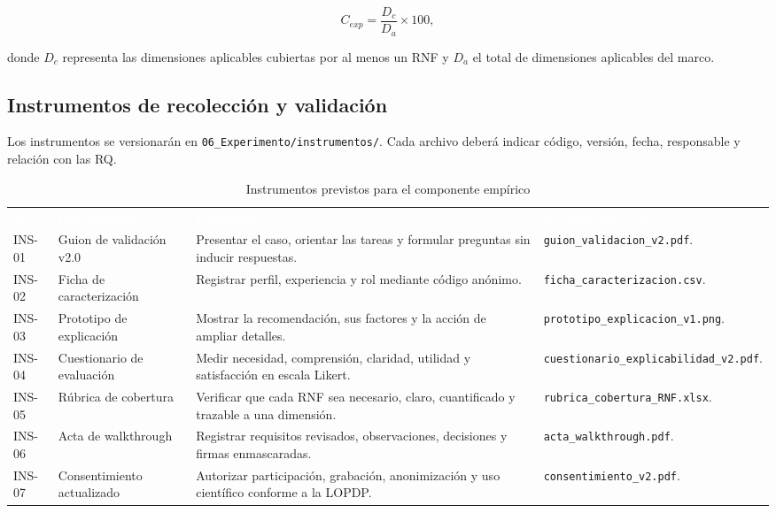 \documentclass[12pt,a4paper]{article}
\begin{document}
\begin{equation}
C_{exp} = \frac{D_c}{D_a} \times 100,
\label{eq:cobertura-explicabilidad}
\end{equation}

donde $D_c$ representa las dimensiones aplicables cubiertas por al menos un RNF y $D_a$ el total de dimensiones aplicables del marco.

\subsection{Instrumentos de recolección y validación}

Los instrumentos se versionarán en \nolinkurl{06_Experimento/instrumentos/}. Cada archivo deberá indicar código, versión, fecha, responsable y relación con las RQ.

\begin{table}[H]
\centering
\caption{Instrumentos previstos para el componente empírico}
\label{tab:instrumentos-experimento}
\small
{}
\begin{tabularx}{\textwidth}{C{1.35cm} L{3.35cm} Y L{3.45cm}}
\textcolor{white}{\textbf{ID}} &
\textcolor{white}{\textbf{Instrumento}} &
\textcolor{white}{\textbf{Finalidad}} &
\textcolor{white}{\textbf{Archivo previsto}}\\
INS-01 & Guion de validación v2.0 & Presentar el caso, orientar las tareas y formular preguntas sin inducir respuestas. & \nolinkurl{guion_validacion_v2.pdf}.\\
INS-02 & Ficha de caracterización & Registrar perfil, experiencia y rol mediante código anónimo. & \nolinkurl{ficha_caracterizacion.csv}.\\
INS-03 & Prototipo de explicación & Mostrar la recomendación, sus factores y la acción de ampliar detalles. & \nolinkurl{prototipo_explicacion_v1.png}.\\
INS-04 & Cuestionario de evaluación & Medir necesidad, comprensión, claridad, utilidad y satisfacción en escala Likert. & \nolinkurl{cuestionario_explicabilidad_v2.pdf}.\\
INS-05 & Rúbrica de cobertura & Verificar que cada RNF sea necesario, claro, cuantificado y trazable a una dimensión. & \nolinkurl{rubrica_cobertura_RNF.xlsx}.\\
INS-06 & Acta de walkthrough & Registrar requisitos revisados, observaciones, decisiones y firmas enmascaradas. & \nolinkurl{acta_walkthrough.pdf}.\\
INS-07 & Consentimiento actualizado & Autorizar participación, grabación, anonimización y uso científico conforme a la LOPDP. & \nolinkurl{consentimiento_v2.pdf}.\\
\end{tabularx}
\end{table}
\end{document}
